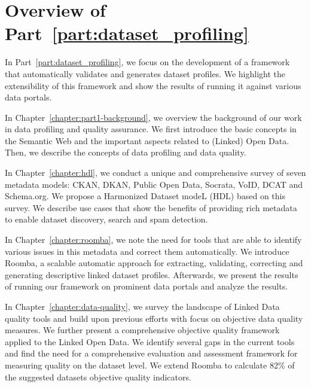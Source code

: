 \chapter*{Overview of Part~\ref{part:dataset_profiling}}

In Part~\ref{part:dataset_profiling}, we focus on the development of a framework that automatically validates and generates dataset profiles. We highlight the extensibility of this framework and show the results of running it against various data portals.

In Chapter~\ref{chapter:part1-background}, we overview the background of our work in data profiling and quality assurance. We first introduce the basic concepts in the Semantic Web and the important aspects related to (Linked) Open Data. Then, we describe the concepts of data profiling and data quality.

In Chapter~\ref{chapter:hdl}, we conduct a unique and comprehensive survey of seven metadata models: CKAN, DKAN, Public Open Data, Socrata, VoID, DCAT and Schema.org. We propose a Harmonized Dataset modeL (HDL) based on this survey. We describe use cases that show the benefits of providing rich metadata to enable dataset discovery, search and spam detection.

In Chapter~\ref{chapter:roomba}, we note the need for tools that are able to identify various issues in this metadata and correct them automatically. We introduce Roomba, a scalable automatic approach for extracting, validating, correcting and generating descriptive linked dataset profiles. Afterwards, we present the results of running our framework on prominent data portals and analyze the results.

In Chapter~\ref{chapter:data-quality}, we survey the landscape of Linked Data quality tools and build upon previous efforts with focus on objective data quality measures. We further present a comprehensive objective quality framework applied to the Linked Open Data. We identify several gaps in the current tools and find the need for a comprehensive evaluation and assessment framework for measuring quality on the dataset level. We extend Roomba to calculate 82\% of the suggested datasets objective quality indicators.